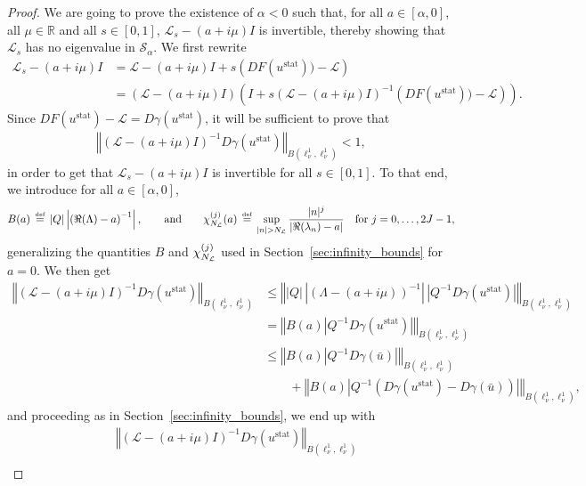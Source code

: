 \documentclass[10pt,a4paper]{article}
\theoremstyle{plain}
\newcommand{\RR}{\mathbb R}
\renewcommand{\L}{\mathcal{L}}
\renewcommand{\S}{\mathcal{S}}
\newcommand{\bu}{\bar{u}}
\newcommand{\1}{\mathbf{1}}
\newcommand{\stat}{\mathrm{stat}}
\newcommand{\bydef}{\,\stackrel{\mbox{\tiny\textnormal{\raisebox{0ex}[0ex][0ex]{def}}}}{=}\,}
\newcommand{\NL}{N_{\text{\tiny{$\L$}}}}
\begin{document}
\begin{proof}
We are going to prove the existence of $\alpha<0$ such that, for all $a\in[\alpha,0]$, all $\mu\in\RR$ and all $s\in[0,1]$, $\L_s - (a+i\mu)I$ is invertible, thereby showing that $\L_s$ has no eigenvalue in $\S_\alpha$. We first rewrite
\begin{align*}
\L_s - (a+i\mu)I &= \L - (a+i\mu)I + s \left(DF(u^\stat)) - \L \right)\\
&= \left(\L - (a+i\mu)I\right) \left(I + s \left(\L - (a+i\mu)I\right)^{-1} \left(DF(u^\stat)) - \L \right)\right).
\end{align*}
Since $DF(u^\stat) - \L=D\gamma(u^\stat)$, it will be sufficient to prove that 
\begin{align*}
\left\Vert \left(\L - (a+i\mu)I\right)^{-1} D\gamma(u^\stat)\right\Vert_{B(\ell^1_\nu,\ell^1_\nu)}<1,
\end{align*}
in order to get that $\L_s - (a+i\mu)I$ is invertible for all $s\in[0,1]$. To that end, we introduce for all $a\in[\alpha,0]$,
\begin{align*}
B(a)\bydef \vert Q\vert  \left\vert\left(\Re(\Lambda)-a\right)^{-1}\right\vert, \qquad\text{and}\qquad \chi^{(j)}_{\NL}(a) \bydef \sup\limits_{\vert n\vert >\NL} \frac{\vert n\vert^j}{\vert \Re(\lambda_n) - a \vert} \quad\text{for }j=0,\ldots,2J-1,
\end{align*}
generalizing the quantities $B$ and $\chi^{(j)}_{\NL}$ used in Section~\ref{sec:infinity_bounds} for $a=0$. 
We then get 
\begin{align*}
\left\Vert \left(\L - (a+i\mu)I\right)^{-1} D\gamma(u^\stat) \right\Vert_{B(\ell^1_\nu,\ell^1_\nu)} &\leq \left\Vert \vert Q\vert \, \left\vert\left(\Lambda - (a+i\mu)\right)^{-1}\right\vert\, \left\vert Q^{-1} D\gamma(u^\stat) \right\vert \right\Vert_{B(\ell^1_\nu,\ell^1_\nu)} \\
&= \left\Vert B(a) \left\vert Q^{-1} D\gamma(u^\stat) \right\vert \right\Vert_{B(\ell^1_\nu,\ell^1_\nu)} \\
&\leq \left\Vert B(a) \left\vert Q^{-1} D\gamma(\bu) \right\vert \right\Vert_{B(\ell^1_\nu,\ell^1_\nu)} \\
&\qquad + \left\Vert B(a) \left\vert Q^{-1} \left(D\gamma(u^\stat) - D\gamma(\bu)\right) \right\vert \right\Vert_{B(\ell^1_\nu,\ell^1_\nu)},
\end{align*}
and proceeding as in Section~\ref{sec:infinity_bounds}, we end up with
\begin{align}
& \left\Vert \left(\L - (a+i\mu)I\right)^{-1} D\gamma(u^\stat) \right\Vert_{B(\ell^1_\nu,\ell^1_\nu)}  \nonumber \\

\end{align}
\end{proof}
\end{document}
